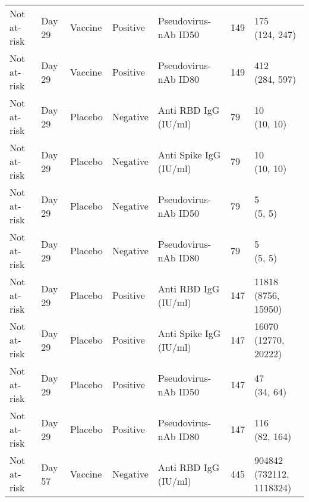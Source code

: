 \documentclass[]{book}
\theoremstyle{definition}
\theoremstyle{definition}
\theoremstyle{definition}
\newcommand{\1}{\mathbbm{1}}
\begin{document}
\begin{landscape}
\begin{ThreePartTable}
\begin{longtable}[t]{>{\raggedright\arraybackslash}p{7cm}llllll}
\hspace{1em}Not at-risk & Day 29 & Vaccine & Positive & Pseudovirus-nAb ID50 & 149 & \makecell[l]{175\\(124, 247)}\\
\hspace{1em}Not at-risk & Day 29 & Vaccine & Positive & Pseudovirus-nAb ID80 & 149 & \makecell[l]{412\\(284, 597)}\\
\hspace{1em}Not at-risk & Day 29 & Placebo & Negative & Anti RBD IgG (IU/ml) & 79 & \makecell[l]{10\\(10, 10)}\\
\hspace{1em}Not at-risk & Day 29 & Placebo & Negative & Anti Spike IgG (IU/ml) & 79 & \makecell[l]{10\\(10, 10)}\\
\hspace{1em}Not at-risk & Day 29 & Placebo & Negative & Pseudovirus-nAb ID50 & 79 & \makecell[l]{5\\(5, 5)}\\
\hspace{1em}Not at-risk & Day 29 & Placebo & Negative & Pseudovirus-nAb ID80 & 79 & \makecell[l]{5\\(5, 5)}\\
\hspace{1em}Not at-risk & Day 29 & Placebo & Positive & Anti RBD IgG (IU/ml) & 147 & \makecell[l]{11818\\(8756, 15950)}\\
\hspace{1em}Not at-risk & Day 29 & Placebo & Positive & Anti Spike IgG (IU/ml) & 147 & \makecell[l]{16070\\(12770, 20222)}\\
\hspace{1em}Not at-risk & Day 29 & Placebo & Positive & Pseudovirus-nAb ID50 & 147 & \makecell[l]{47\\(34, 64)}\\
\hspace{1em}Not at-risk & Day 29 & Placebo & Positive & Pseudovirus-nAb ID80 & 147 & \makecell[l]{116\\(82, 164)}\\
\hspace{1em}Not at-risk & Day 57 & Vaccine & Negative & Anti RBD IgG (IU/ml) & 445 & \makecell[l]{904842\\(732112, 1118324)}\\

\end{longtable}
\end{ThreePartTable}
\end{landscape}
\end{document}
